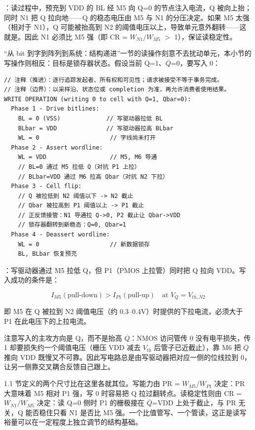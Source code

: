 ：读过程中，预充到 VDD 的 BL 经 M5 向 Q=0 的节点注入电流，Q 被向上抬；同时 N1 把 Q 拉向地——Q 的稳态电压由 M5 与 N1 的分压决定。如果 M5 太强（相对于 N1），Q 可能被抬高到 N2 的阈值电压以上，导致单元意外翻转——这就是。因此 N1 必须比 M5 强（即 CR = $W_{N1}/W_{M5}$ $>$ 1），保证读稳定性。


“从 bit 到字到阵列到系统：结构递进”一节的读操作刻意不去扰动单元，本小节的写操作则相反：目标是锁存器状态。假设当前 Q=1、$\overline{Q}$=0，要写入 0：

\begin{lstlisting}
// 注释（推进）：逐行追踪发起者、所有权和可见性；请求被接受不等于事务完成。
// 注释（边界）：以采样沿、状态位或 completion 为准，再允许消费者使用结果。
WRITE OPERATION (writing 0 to cell with Q=1, Qbar=0):
  Phase 1 - Drive bitlines:
    BL = 0 (VSS)             // 写驱动器拉低 BL
    BLbar = VDD              // 写驱动器拉高 BLbar
    WL = 0                    // 字线尚未打开
  Phase 2 - Assert wordline:
    WL = VDD                  // M5, M6 导通
    // BL=0 通过 M5 拉低 Q（对抗 P1 上拉）
    // BLbar=VDD 通过 M6 拉高 Qbar（对抗 N2 下拉）
  Phase 3 - Cell flip:
    // Q 被拉低到 N2 阈值以下 -> N2 截止
    // Qbar 被拉高到 P1 阈值以上 -> P1 截止
    // 正反馈接管：N1 导通拉 Q->0, P2 截止让 Qbar->VDD
    // 锁存器翻转到新稳态：Q=0, Qbar=1
  Phase 4 - Deassert wordline:
    WL = 0                    // 新数据锁存
    BL, BLbar 恢复预充
\end{lstlisting}

：写驱动器通过 M5 拉低 Q，但 P1（PMOS 上拉管）同时把 Q 拉向 VDD。写入成功的条件是：

$$I_{M5}(\text{pull-down}) > I_{P1}(\text{pull-up}) \quad \text{at } V_Q = V_{th,N2}$$

即 M5 在 Q 被拉到 N2 阈值电压（约 0.3--0.4V）时提供的下拉电流，必须大于 P1 在此电压下的上拉电流。

注意写入的主攻方向是 Q，而不是抬高 $\overline{Q}$：NMOS 访问管传 0 没有电平损失，传 1 却要损失约一个阈值电压（栅压 VDD 减去 $V_{th}$ 后管子已近截止），靠 M6 把 $\overline{Q}$ 推向 VDD 既慢又不可靠。因此写电路总是由写驱动器把对应一侧的位线拉到 0，让另一侧靠交叉耦合反馈自己跟上。

1.1 节定义的两个尺寸比在这里各就其位。写能力由 PR = $W_{M5}/W_{P1}$ 决定：PR 大意味着 M5 相对 P1 强，写 0 时容易把 Q 拉过翻转点。读稳定性则由 CR = $W_{N1}/W_{M5}$ 决定：读 Q=0 侧时 P1 的栅极接在 $\overline{Q}$=VDD 上处于截止，与 PR 无关，Q 能否稳住只看 N1 是否比 M5 强。一个比值管写、一个管读，这正是读写裕量可以在一定程度上独立调节的结构基础。

